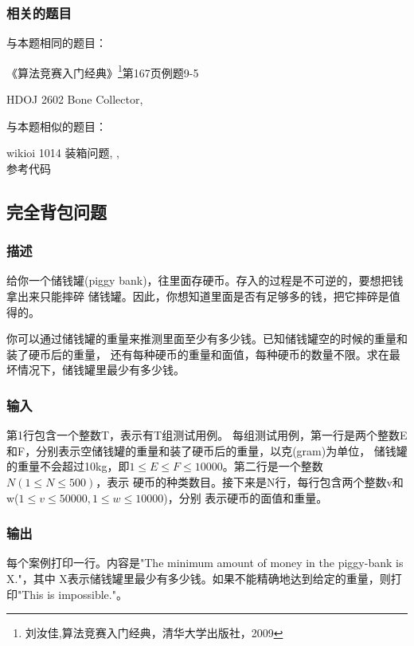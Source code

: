 \subsubsection{相关的题目}
与本题相同的题目：
\begindot
\item 《算法竞赛入门经典》\footnote{刘汝佳,算法竞赛入门经典，清华大学出版社，2009}第167页例题9-5
\item  HDOJ 2602 Bone Collector, 
\myenddot

与本题相似的题目：
\begindot
\item  wikioi 1014 装箱问题, , \\
参考代码 
\myenddot

\subsection{完全背包问题}
\label{sec:ukp}

\subsubsection{描述}
给你一个储钱罐(piggy bank)，往里面存硬币。存入的过程是不可逆的，要想把钱拿出来只能摔碎
储钱罐。因此，你想知道里面是否有足够多的钱，把它摔碎是值得的。

你可以通过储钱罐的重量来推测里面至少有多少钱。已知储钱罐空的时候的重量和装了硬币后的重量，
还有每种硬币的重量和面值，每种硬币的数量不限。求在最坏情况下，储钱罐里最少有多少钱。

\subsubsection{输入}
第1行包含一个整数T，表示有T组测试用例。
每组测试用例，第一行是两个整数E和F，分别表示空储钱罐的重量和装了硬币后的重量，以克(gram)为单位，
储钱罐的重量不会超过10kg，即$1 \leq E \leq F \leq 10000$。第二行是一个整数$N(1 \leq N \leq 500)$，表示
硬币的种类数目。接下来是N行，每行包含两个整数v和w($1 \leq v \leq 50000, 1 \leq w \leq 10000$)，分别
表示硬币的面值和重量。

\subsubsection{输出}
每个案例打印一行。内容是"The minimum amount of money in the piggy-bank is X."，其中
X表示储钱罐里最少有多少钱。如果不能精确地达到给定的重量，则打印"This is impossible."。

